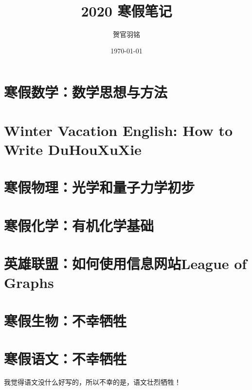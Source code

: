 \documentclass[UTF8]{ctexart}
\author{贺官羽铭}
\date{\today}
\title{2020 寒假笔记}
\begin{document}
\pagestyle{plain}


\newpage
\maketitle

\newpage
{}


\newpage
\tableofcontents

\newpage


\newpage
\pagestyle{fancy}

\part{寒假数学：数学思想与方法}


\newpage
\part{Winter Vacation English: How to Write DuHouXuXie}


\newpage
\part{寒假物理：光学和量子力学初步}


\newpage
\part{寒假化学：有机化学基础}


\newpage
\part{英雄联盟：如何使用信息网站League of Graphs}


\newpage
\part{寒假生物：不幸牺牲}


\newpage
\part{寒假语文：不幸牺牲}
我觉得语文没什么好写的，所以不幸的是，语文壮烈牺牲！

\newpage



\newpage
\listoffigures

\vspace{3cm}
\listoftables
\end{document}
